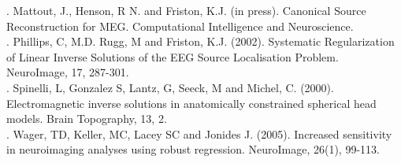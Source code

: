 . Mattout, J., Henson, R N. and Friston, K.J. (in press). Canonical Source Reconstruction for MEG. Computational Intelligence and Neuroscience.\\

. Phillips, C, M.D. Rugg, M and Friston, K.J. (2002). Systematic Regularization of Linear Inverse Solutions of the EEG Source Localisation Problem. NeuroImage, 17, 287-301.\\

. Spinelli, L, Gonzalez S, Lantz, G, Seeck, M and Michel, C. (2000). Electromagnetic inverse solutions in anatomically constrained spherical head models. Brain Topography, 13, 2.\\

. Wager, TD, Keller, MC, Lacey SC and Jonides J. (2005). Increased sensitivity in neuroimaging analyses using robust regression. NeuroImage, 26(1), 99-113.\\
